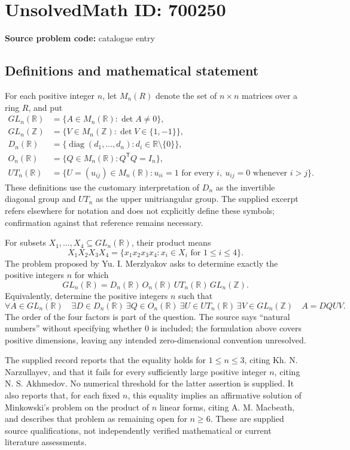\documentclass[11pt]{article}
\newcommand{\Z}{\mathbb{Z}}
\newcommand{\R}{\mathbb{R}}
\begin{document}
\section*{UnsolvedMath ID: 700250}
\textbf{Source problem code:} catalogue entry
\subsection{Definitions and mathematical statement}
For each positive integer \(n\), let \(M_n(R)\) denote the set of \(n\times n\) matrices over a ring \(R\), and put
\[
\begin{aligned}
GL_n(\R)&=\{A\in M_n(\R):\det A\ne0\},\\
GL_n(\Z)&=\{V\in M_n(\Z):\det V\in\{1,-1\}\},\\
D_n(\R)&=\{\operatorname{diag}(d_1,\ldots,d_n):d_i\in\R\setminus\{0\}\},\\
O_n(\R)&=\{Q\in M_n(\R):Q^{\mathsf T}Q=I_n\},\\
UT_n(\R)&=\{U=(u_{ij})\in M_n(\R):u_{ii}=1\text{ for every }i,
\ u_{ij}=0\text{ whenever }i>j\}.
\end{aligned}
\]
These definitions use the customary interpretation of \(D_n\) as the invertible diagonal group and \(UT_n\) as the upper unitriangular group. The supplied excerpt refers elsewhere for notation and does not explicitly define these symbols; confirmation against that reference remains necessary.

For subsets \(X_1,\ldots,X_4\subseteq GL_n(\R)\), their product means
\[
X_1X_2X_3X_4=\{x_1x_2x_3x_4:x_i\in X_i\text{ for }1\le i\le4\}.
\]
The problem proposed by Yu. I. Merzlyakov asks to determine exactly the positive integers \(n\) for which
\[
GL_n(\R)=D_n(\R)\,O_n(\R)\,UT_n(\R)\,GL_n(\Z).
\]
Equivalently, determine the positive integers \(n\) such that
\[
\forall A\in GL_n(\R)\quad
\exists D\in D_n(\R)\ \exists Q\in O_n(\R)\
\exists U\in UT_n(\R)\ \exists V\in GL_n(\Z)
\quad A=DQUV.
\]
The order of the four factors is part of the question. The source says ``natural numbers'' without specifying whether \(0\) is included; the formulation above covers positive dimensions, leaving any intended zero-dimensional convention unresolved.

The supplied record reports that the equality holds for \(1\le n\le3\), citing Kh. N. Narzullayev, and that it fails for every sufficiently large positive integer \(n\), citing N. S. Akhmedov. No numerical threshold for the latter assertion is supplied. It also reports that, for each fixed \(n\), this equality implies an affirmative solution of Minkowski's problem on the product of \(n\) linear forms, citing A. M. Macbeath, and describes that problem as remaining open for \(n\ge6\). These are supplied source qualifications, not independently verified mathematical or current literature assessments.
\end{document}
